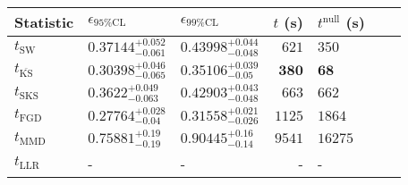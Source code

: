 \begin{tabular}{l|llr|llr}
	Statistic & $\epsilon_{95\%\mathrm{CL}}$ & $\epsilon_{99\%\mathrm{CL}}$ & $t$ (s) & $t^{\mathrm{null}}$ (s) \\
	\midrule
	$t_{\mathrm{SW}}$ & $0.37144_{-0.061}^{+0.052}$ & $0.43998_{-0.048}^{+0.044}$ & $621$ & $350$ \\
	$t_{\overline{\mathrm{KS}}}$ & $0.30398_{-0.065}^{+0.046}$ & $0.35106_{-0.05}^{+0.039}$ & ${\mathbf{380}}$ & ${\mathbf{68}}$ \\
	$t_{\mathrm{SKS}}$ & $0.3622_{-0.063}^{+0.049}$ & $0.42903_{-0.048}^{+0.043}$ & $663$ & $662$ \\
	$t_{\mathrm{FGD}}$ & ${\mathbf{0.27764_{-0.04}^{+0.028}}}$ & ${\mathbf{0.31558_{-0.026}^{+0.021}}}$ & $1125$ & $1864$ \\
	$t_{\mathrm{MMD}}$ & $0.75881_{-0.19}^{+0.19}$ & $0.90445_{-0.14}^{+0.16}$ & $9541$ & $16275$ \\
	$t_{\mathrm{LLR}}$ & - & - & - & - \\
	\bottomrule
\end{tabular}